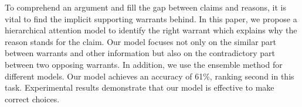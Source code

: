 To comprehend an argument and fill the gap between claims and reasons, it is vital to find the implicit supporting warrants behind. In this paper, we propose a hierarchical attention model to identify the right warrant which explains why the reason stands for the claim. Our model focuses not only on the similar part between warrants and other information but also on the contradictory part between two opposing warrants. In addition, we use the ensemble method for different models. Our model achieves an accuracy of 61\%, ranking second in this task. Experimental results demonstrate that our model is effective to make correct choices.
